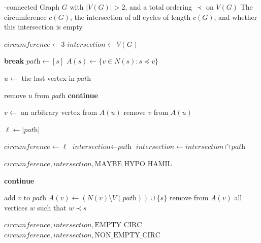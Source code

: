\begin{algorithm}
\caption{\textsc{FindIntersectionAllK}$(G,\prec)$}
\label{alg:find-all-k-intersection}

\begin{algorithmic}[1]
-connected Graph $G$ with $|V(G)|>2$, and a total ordering $\prec$ on $V(G)$
\Ensure The circumference $c(G)$, the intersection of all cycles of length $c(G)$, and whether this intersection is empty

\State $\textit{circumference} \gets 3$
\State $\textit{intersection} \gets V(G)$

        \State \textbf{break}
    \EndIf
    \State $\textit{path} \gets [s]$
    \State $A(s) \gets \{v \in N(s) : s \preceq v\}$

        \State $u \gets$ the last vertex in $\textit{path}$

            \State remove $u$ from $\textit{path}$
            \State \textbf{continue}
        \EndIf

        \State $v \gets$ an arbitrary vertex from $A(u)$
        \State remove $v$ from $A(u)$

            \State $\ell \gets |\textit{path}|$

                \State $\textit{circumference} \gets \ell$
                \State $\textit{intersection} \gets \textit{path}$
                \State $\textit{intersection} \gets
                \textit{intersection} \cap \textit{path}$
            \EndIf

                \State \Return $\textit{circumference},\textit{intersection},\text{MAYBE\_HYPO\_HAMIL}$
            \EndIf

            \State \textbf{continue}
        \EndIf

        \State add $v$ to $\textit{path}$
        \State $A(v) \gets
        (N(v) \setminus V(\textit{path})) \cup \{s\}$
        \State remove from $A(v)$ all vertices $w$ such that $w \prec s$
    \EndWhile
\EndFor

    \State \Return $\textit{circumference},\textit{intersection},\text{EMPTY\_CIRC}$
\EndIf
\State \Return $\textit{circumference},\textit{intersection},\text{NON\_EMPTY\_CIRC}$
\end{algorithmic}
\end{algorithm}


